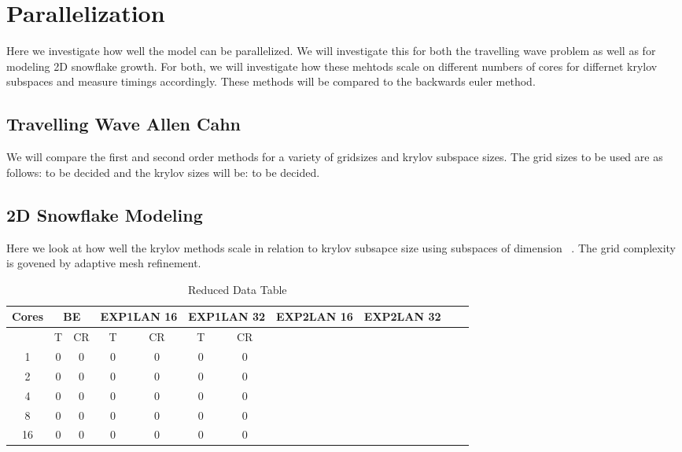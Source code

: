 \section{Parallelization}

Here we investigate how well the model can be parallelized.
We will investigate this for both the travelling wave problem as well as for modeling 2D snowflake growth.
For both, we will investigate how these mehtods scale on different numbers of cores for differnet krylov subspaces and measure timings accordingly.
These methods will be compared to the backwards euler method.

\subsection{Travelling Wave Allen Cahn}

We will compare the first and second order methods for a variety of gridsizes and krylov subspace sizes.
The grid sizes to be used are as follows: to be decided and the krylov sizes will be: to be decided.


\subsection{2D Snowflake Modeling}

Here we look at how well the krylov methods scale in relation to krylov subsapce size using subspaces of dimension ~.
The grid complexity is govened by adaptive mesh refinement.

\begin{table}[H]
    \centering
    \begin{tabular}{| c | c c | c c | c c | c c | c c | c c |}
    \hline
    Cores & \multicolumn{2}{c|}{BE} & \multicolumn{2}{c|}{EXP1LAN 16} & \multicolumn{2}{c|}{EXP1LAN 32} & \multicolumn{2}{c|}{EXP2LAN 16} & \multicolumn{2}{c|}{EXP2LAN 32} \\
    \hline
    & T & CR & T & CR & T & CR \\
    \hline
    1  & 0 & 0 & 0 & 0 & 0 & 0 \\
    2  & 0 & 0 & 0 & 0 & 0 & 0 \\
    4  & 0 & 0 & 0 & 0 & 0 & 0 \\
    8  & 0 & 0 & 0 & 0 & 0 & 0 \\
    16 & 0 & 0 & 0 & 0 & 0 & 0 \\
    \hline
    \end{tabular}
    \caption{Reduced Data Table}
    \label{tab:reduced_data}
\end{table}
